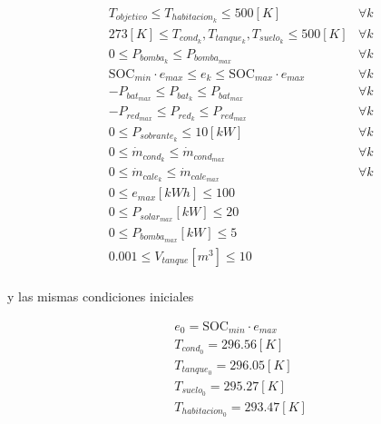 \begin{align}
	 & T_{objetivo} \leq T_{habitacion_k} \leq 500[K]                                    & \forall k \\
	 & 273[K] \leq T_{cond_k}, T_{tanque_k}, T_{suelo_k} \leq 500[K]                     & \forall k \\
	 & 0 \leq P_{bomba_k} \leq P_{bomba_{max}} \quad                                     & \forall k \\
	 & \text{SOC}_{min} \cdot e_{max} \leq e_k \leq \text{SOC}_{max} \cdot e_{max} \quad & \forall k \\
	 & -P_{bat_{max}} \leq P_{bat_k} \leq P_{bat_{max}} \quad                            & \forall k \\
	 & -P_{red_{max}} \leq P_{red_k} \leq P_{red_{max}} \quad                            & \forall k \\
	 & 0 \leq P_{sobrante_k} \leq 10[kW] \quad                                           & \forall k \\
	 & 0 \leq \dot{m}_{cond_k} \leq \dot{m}_{cond_{max}} \quad                           & \forall k \\
	 & 0 \leq \dot{m}_{cale_k} \leq \dot{m}_{cale_{max}} \quad                           & \forall k \\
	 & 0 \leq e_{max} [kWh] \leq 100                                                                 \\
	 & 0 \leq P_{solar_{max}} [kW] \leq 20                                                           \\
	 & 0 \leq P_{bomba_{max}} [kW] \leq 5                                                            \\
	 & 0.001 \leq V_{tanque} [m^3] \leq 10                                                           \\
\end{align}

y las mismas condiciones iniciales

\begin{align}
	 & e_0 = \text{SOC}_{min} \cdot e_{max} \\
	 & T_{cond_0} = 296.56 [K]              \\
	 & T_{tanque_0} = 296.05[K]             \\
	 & T_{suelo_0} = 295.27[K]              \\
	 & T_{habitacion_0} = 293.47[K]         \\
\end{align}

